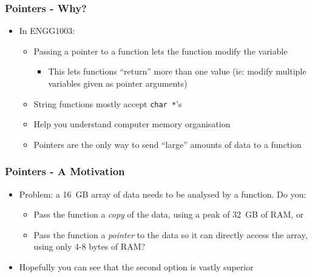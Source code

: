 \documentclass[14pt]{beamer}
\begin{document}
\begin{frame}
\frametitle{Pointers - Why?}
\begin{itemize}
\item In ENGG1003:
	\begin{itemize}
		\item Passing a pointer to a function lets the function modify the variable
		\begin{itemize}
		\item This lets functions ``return'' more than one value (ie: modify multiple variables given as pointer arguments)
		\end{itemize}
		\item String functions mostly accept \texttt{char *}'s
		\item Help you understand computer memory organisation
		\item Pointers are the only way to send ``large'' amounts of data to a function
	\end{itemize}
\end{itemize}
\end{frame}

\begin{frame}
\frametitle{Pointers - A Motivation}
\begin{itemize}
\item Problem: a 16~GB array of data needs to be analysed by a function. Do you:
\pause
	\begin{itemize}
		\item Pass the function a \textit{copy} of the data, using a peak of 32~GB of RAM, or
		\pause
		\item Pass the function a \textit{pointer} to the data so it can directly access the array, using only 4-8 bytes of RAM?
	\end{itemize}
\pause
\item Hopefully you can see that the second option is vastly superior
\end{itemize}
\end{frame}
\end{document}

